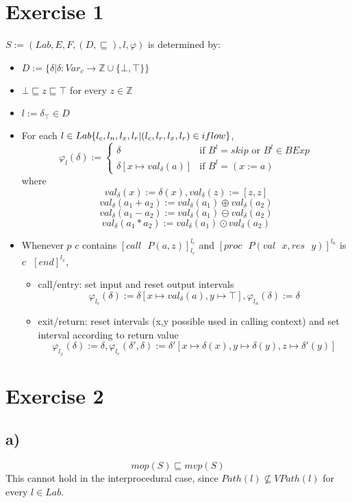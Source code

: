 \documentclass[fleqn,12pt]{article}
\begin{document}
\section*{Exercise 1}
$S:=(Lab,E,F,(D,\sqsubseteq),l,\varphi)$ is determined by:
\begin{itemize}
\item $D:=\{\delta | \delta: Var_c \rightarrow \mathbb{Z} \cup \{\bot, \top\}\}$
\item $\bot \sqsubseteq z \sqsubseteq \top$ for every $z \in \mathbb{Z}$
\item $l:= \delta_{\top} \in D$
\item For each $l \in Lab \\ \{l_c,l_n,l_x,l_r | (l_c,l_r,l_x,l_r) \in iflow\}$,
\[
 \varphi_l(\delta) := 
  \begin{cases} 
   \delta & \text{if } B^{l} = skip \text{ or } B^{l} \in BExp \\
   \delta [x \mapsto val_{\delta}(a)]       & \text{if } B^l = (x:=a)
  \end{cases}
\]
where
$$val_{\delta}(x):=\delta(x), val_{\delta}(z):=[z,z]$$
$$val_{\delta}(a_1+a_2):=val_{\delta}(a_1) \oplus val_{\delta}(a_2)$$
$$val_{\delta}(a_1-a_2):=val_{\delta}(a_1) \ominus val_{\delta}(a_2)$$
$$val_{\delta}(a_1*a_2):=val_{\delta}(a_1) \odot val_{\delta}(a_2)$$
\item Whenever $p$ $c$ contains $[call \text{ } P(a,z)]^{l_c}_{l_r}$ and $[proc \text{ } P(val \text{ } x,res \text{ } y)]^{l_n}$ is $c \text{ } [end]^{l_x}$,
\begin{itemize}
\item call/entry: set input and reset output intervals
$$\varphi_{l_c}(\delta) := \delta [x \mapsto val_{\delta}(a),y \mapsto \top], \varphi_{l_n}(\delta) := \delta$$
\item exit/return: reset intervals (x,y possible used in calling context) and set interval according to return value
$$\varphi_{l_x}(\delta) := \delta, \varphi_{l_r}(\delta ', \delta) := \delta '[x \mapsto \delta(x), y \mapsto \delta(y),z\mapsto \delta '(y)] $$
\end{itemize}
\end{itemize}
\section*{Exercise 2}
\subsection*{a)}
$$mop(S) \sqsubseteq mvp(S)$$
This cannot hold in the interprocedural case, since $Path(l) \nsubseteq VPath(l)$ for every $l \in Lab$.
\end{document}
